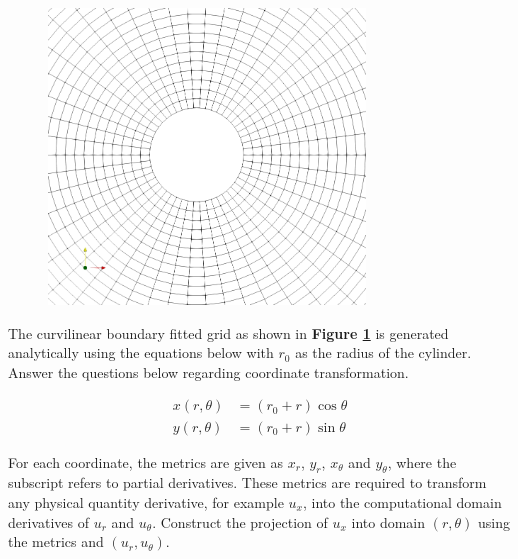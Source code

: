 \clearpage		%
\question{}\label{q4}


		\begin{figure}[H] %
		\centering
		\includegraphics[width=0.75\textwidth, height=0.5\textwidth]{cylinderGrid-1}
		\caption{\rajah}
		\label{fig:cylinder}
	    \end{figure}	

The curvilinear boundary fitted grid as shown in \textbf{Figure \ref{fig:cylinder}}
is generated analytically using the equations below with $r_{0}$ as the radius of the cylinder. Answer the questions below regarding coordinate transformation.


\begin{subequations}
\begin{align}
x(r, \theta) &= (r_{0} + r) \cos \theta \nonumber  \\ \nonumber
y(r, \theta) &= (r_{0} + r)\sin \theta
\end{align}
\end{subequations}
		
\listbeginx	%

\item For each coordinate, the metrics are given as $x_{r}$, $y_{r}$, $x_{\theta}$ and $y_{\theta}$, where the subscript refers to partial derivatives. These metrics are required to transform any physical quantity derivative, for example $u_{x}$, into the computational domain derivatives of $u_{r}$ and $u_{\theta}$. Construct the projection of $u_{x}$ into domain $(r, \theta)$ using the metrics and $(u_{r},u_{\theta})$. 

